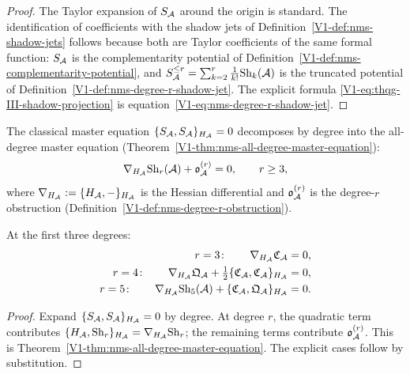 \begin{proof}
The Taylor expansion of $S_{\mathcal{A}}$ around the origin is
standard. The identification of coefficients with the shadow
jets of
Definition~\ref{V1-def:nms-shadow-jets} follows because both
are Taylor coefficients of the same formal function: $S_{\mathcal{A}}$
is the complementarity potential of
Definition~\ref{V1-def:nms-complementarity-potential}, and
$S_{\mathcal{A}}^{\le r} = \sum_{k=2}^r \frac{1}{k!} \mathrm{Sh}_k(\mathcal{A})$
is the truncated potential of
Definition~\ref{V1-def:nms-degree-r-shadow-jet}. The explicit
formula \eqref{V1-eq:thqg-III-shadow-projection} is
equation~\eqref{V1-eq:nms-degree-r-shadow-jet}.
\end{proof}

\begin{corollary}
The classical master equation $\{S_{\mathcal{A}}, S_{\mathcal{A}}\}_{H_{\mathcal{A}}} = 0$
decomposes by degree into the all-degree master equation
\textup{(}Theorem~\textup{\ref{V1-thm:nms-all-degree-master-equation})}:
\begin{equation}%
\nabla_{H_\cA} \Sh_r(\cA) + \mathfrak{o}_\cA^{(r)} = 0,
\qquad r \ge 3,
\end{equation}
where
$\nabla_{H_{\mathcal{A}}} := \{H_{\mathcal{A}}, -\}_{H_{\mathcal{A}}}$ is the Hessian
differential and $\mathfrak{o}_{\mathcal{A}}^{(r)}$ is the degree-$r$
obstruction
\textup{(}Definition~\textup{\ref{V1-def:nms-degree-r-obstruction})}.

At the first three degrees:
\begin{align}
r = 3\colon\qquad
\nabla_{H_{\mathcal{A}}} \mathfrak{C}_{\mathcal{A}} &= 0,
\\
r = 4\colon\qquad
\nabla_{H_{\mathcal{A}}} \mathfrak{Q}_{\mathcal{A}}
+ \tfrac{1}{2}\{\mathfrak{C}_{\mathcal{A}}, \mathfrak{C}_{\mathcal{A}}\}_{H_{\mathcal{A}}}
&= 0,
\\
r = 5\colon\qquad
\nabla_{H_{\mathcal{A}}} \mathrm{Sh}_5(\mathcal{A})
+ \{\mathfrak{C}_{\mathcal{A}}, \mathfrak{Q}_{\mathcal{A}}\}_{H_{\mathcal{A}}}
&= 0.
\end{align}
\end{corollary}

\begin{proof}
Expand $\{S_{\mathcal{A}}, S_{\mathcal{A}}\}_{H_{\mathcal{A}}} = 0$ by degree.
At degree $r$, the quadratic term contributes
$\{H_{\mathcal{A}}, \mathrm{Sh}_r\}_{H_{\mathcal{A}}} = \nabla_{H_{\mathcal{A}}} \mathrm{Sh}_r$;
the remaining terms contribute $\mathfrak{o}_{\mathcal{A}}^{(r)}$.
This is Theorem~\ref{V1-thm:nms-all-degree-master-equation}.
The explicit cases follow by substitution.
\end{proof}

